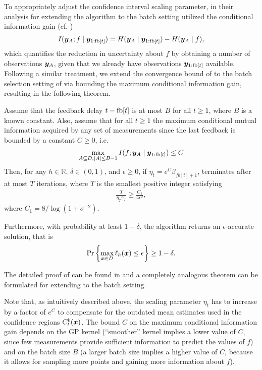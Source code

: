 To appropriately adjust the confidence interval scaling parameter,
in their analysis for extending the \gpucb algorithm to the batch
setting \citet{desautels12} utilized the
conditional information gain (cf. )
\begin{align*}
I(\bm{y}_A; f \mid \bm{y}_{1:\mathop{\mathrm{fb}}[t]}) = H(\bm{y}_A\mid\bm{y}_{1:\mathop{\mathrm{fb}}[t]}) - H(\bm{y}_A\mid f),
\end{align*}
which quantifies the reduction in uncertainty about $f$ by obtaining
a number of observations $\bm{y}_A$, given that we already have observations
$\bm{y}_{1:\mathop{\mathrm{fb}}[t]}$ available.
Following a similar treatment, we extend the convergence bound of
 to the batch selection setting of
\bacl via bounding the maximum conditional information gain, resulting
in the following theorem.

\begin{theorem}
\label{thm:bacl}
Assume that the feedback delay $t - \mathop{\mathrm{fb}}[t]$ is at most $B$ for all $t \geq 1$,
where $B$ is a known constant.
Also, assume that for all $t \geq 1$ the maximum conditional mutual information
acquired by any set of measurements since the last feedback is bounded
by a constant $C \geq 0$, i.e.
\begin{align*}
\max_{A\subseteq D, |A|\leq B-1} I(f; \bm{y}_A \mid \bm{y}_{1:\mathop{\mathrm{fb}}[t]}) \leq C
\end{align*}
Then, for any $h\in\mathbb{R}$, $\delta \in (0, 1)$, and $\epsilon \geq 0$,
if $\eta_t = e^C\beta_{fb[t]+1}$, \bacl terminates after
at most $T$ iterations, where $T$ is the smallest positive integer
satisfying
\begin{align*}
\frac{T}{\eta_T \gamma_T} \geq \frac{C_1}{4\epsilon^2},
\end{align*}
where $C_1 = 8/\log(1 + \sigma^{-2})$.

Furthermore, with probability at least $1-\delta$, the algorithm returns
an $\epsilon$-accurate solution, that is
\begin{align*}
\Pr\left\{\max_{\bm{x}\in D}\ell_h(\bm{x}) \leq \epsilon\right\} \geq 1 - \delta.
\end{align*}
\end{theorem}

The detailed proof of  can be found in
 and a completely analogous theorem can be
formulated for extending \iacl to the batch setting.

Note that, as intuitively described above, the scaling parameter
$\eta_t$ has to increase by a factor of $e^C$ to compensate for the outdated
mean estimates used in the confidence regions $C_t^b(\bm{x})$.
The bound $C$ on the maximum conditional information gain depends on the
GP kernel (``smoother'' kernel implies a lower value of $C$, since few
measurements provide sufficient information to predict the values of $f$)
and on the batch size $B$ (a larger batch size implies a higher value
of $C$, because it allows for sampling more points and gaining more
information about $f$).


